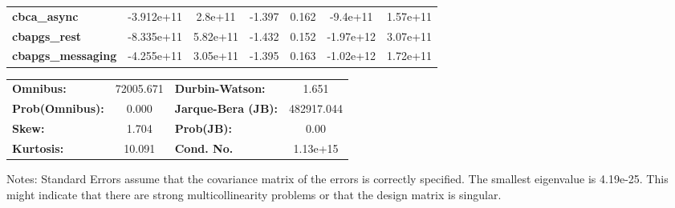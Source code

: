 \documentclass{report}
\begin{document}
\begin{center}
\begin{tabular}{lcccccc}
\textbf{cbca\_async}       &   -3.912e+11  &      2.8e+11     &    -1.397  &         0.162        &     -9.4e+11    &     1.57e+11     \\
\textbf{cbapgs\_rest}      &   -8.335e+11  &     5.82e+11     &    -1.432  &         0.152        &    -1.97e+12    &     3.07e+11     \\
\textbf{cbapgs\_messaging} &   -4.255e+11  &     3.05e+11     &    -1.395  &         0.163        &    -1.02e+12    &     1.72e+11     \\
\bottomrule
\end{tabular}
\begin{tabular}{lclc}
\textbf{Omnibus:}       & 72005.671 & \textbf{  Durbin-Watson:     } &     1.651   \\
\textbf{Prob(Omnibus):} &    0.000  & \textbf{  Jarque-Bera (JB):  } & 482917.044  \\
\textbf{Skew:}          &    1.704  & \textbf{  Prob(JB):          } &      0.00   \\
\textbf{Kurtosis:}      &   10.091  & \textbf{  Cond. No.          } &  1.13e+15   \\
\bottomrule
\end{tabular}
\end{center}

Notes: \newline
 [1] Standard Errors assume that the covariance matrix of the errors is correctly specified. \newline
 [2] The smallest eigenvalue is 4.19e-25. This might indicate that there are \newline
 strong multicollinearity problems or that the design matrix is singular.
\end{document}
